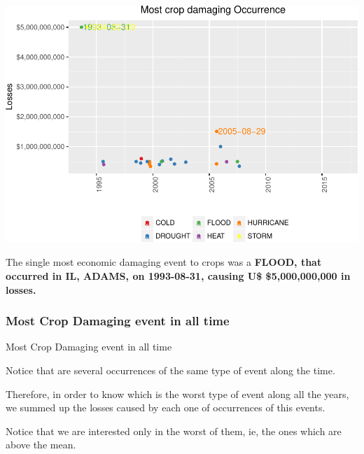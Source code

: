 \documentclass[]{article}
\begin{document}
\includegraphics{readme_files/figure-latex/crop-single-plot-1.pdf}

The single most economic damaging event to crops was a \textbf{FLOOD,
that occurred in IL, ADAMS, on 1993-08-31, causing U\$ \$5,000,000,000
in losses.}

\subsubsection{Most Crop Damaging event in all
time}\label{most-crop-damaging-event-in-all-time}

Most Crop Damaging event in all time

Notice that are several occurrences of the same type of event along the
time.

Therefore, in order to know which is the worst type of event along all
the years, we summed up the losses caused by each one of occurrences of
this events.

Notice that we are interested only in the worst of them, ie, the ones
which are above the mean.
\end{document}
